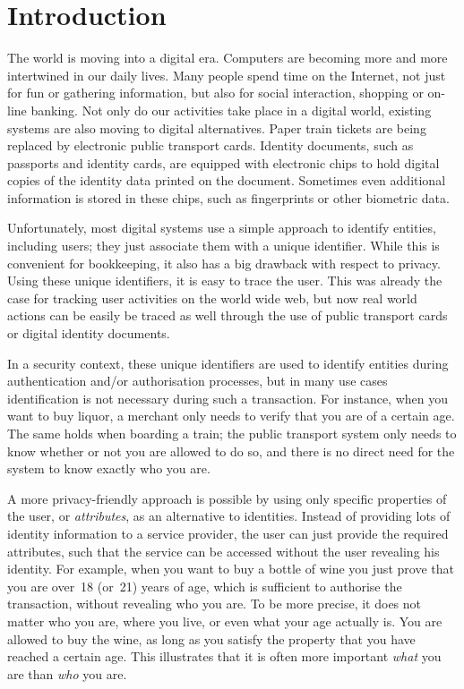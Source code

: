 \chapter{Introduction}

The world is moving into a digital era. Computers are becoming more and more
intertwined in our daily lives. Many people spend time on the Internet, not just
for fun or gathering information, but also for social interaction, shopping or
on-line banking. Not only do our activities take place in a digital world,
existing systems are also moving to digital alternatives. Paper train tickets
are being replaced by electronic public transport cards. Identity documents,
 such as passports and identity cards, are equipped
with electronic chips to hold digital copies of the identity data printed on the
document. Sometimes even additional information is stored in these chips, such
as fingerprints or other biometric data.

Unfortunately, most digital systems use a simple approach to identify entities, including users;
they just associate them with a unique identifier.
While this is convenient for bookkeeping, it also has a big drawback with
respect to privacy. Using these unique identifiers, it
is easy to trace the user. This was already the case for tracking user
activities on the world wide web, but now real world actions can be easily be
traced as well through the use of public transport cards or digital identity
documents.

In a security context, these unique identifiers are
used to identify entities during authentication and/or
authorisation processes, but in many use cases
identification is not necessary during such a transaction. For instance, when
you want to buy liquor, a merchant only needs to verify that you are of a
certain age. The same holds when boarding a train; the public transport system
only needs to know whether or not you are allowed to do so, and there is no
direct need for the system to know exactly who you are.

A more privacy-friendly approach is possible by using only specific properties
of the user, or \emph{attributes}, as an alternative to
identities. Instead of providing lots of identity
information to a service provider, the user can just provide the required
attributes, such that the service can be accessed without the user revealing his
identity. For example, when you want to buy a bottle of wine you just prove that
you are over~18 (or~21) years of age, which is sufficient to
authorise the transaction, without revealing who you are.
To be more precise, it does not matter who you are, where
you live, or even what your age actually is. You are allowed to buy the wine, as
long as you satisfy the property that you have reached a certain age. This
illustrates that it is often more important \emph{what} you are than \emph{who}
you are.

